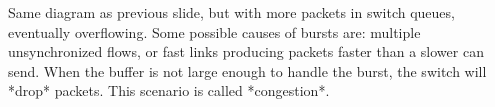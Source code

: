 \begin{frame}
{
}{
Same diagram as previous slide, but with more packets in switch queues, eventually overflowing.
Some possible causes of bursts are: multiple unsynchronized flows, or fast links producing packets faster than a slower can send. 
When the buffer is not large enough to handle the burst, the switch will *drop* packets. This scenario is called *congestion*.
}
\end{frame}

